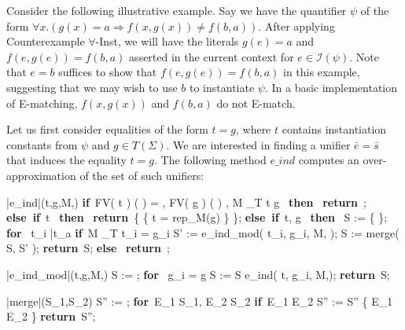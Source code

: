 \documentclass{llncs}
\def\IF{\qtab\keyword{if}\ }
\def\THEN{\ \keyword{then}\ }
\def\ELSE{\untab\qtab\keyword{else}\ }
\def\ELSEIF{\untab\qtab\keyword{else if}\ }
\def\FI{\untab}
\def\RETURN{\keyword{return}\ }
\def\ENDPROC{\untab}
\def\DOFOR{\qtab\keyword{for}\ }
\def\ENDFOR{\untab}
\def\keyword#1{\mbox{\normalshape\bf #1}}
\begin{document}
Consider the following illustrative example.
Say we have the quantifier $\psi$ of the form $\forall x. (g(x) = a \Rightarrow f( x, g( x ) ) \neq f( b, a ))$.
After applying Counterexample $\forall$-Inst, we will have the literals $g(e) = a$ and $f( e, g( e ) ) = f( b, a )$ asserted in the current context for $e \in \mathcal{I}( \psi )$.
Note that $e = b$ suffices to show that $f( e, g( e ) ) = f( b, a )$ in this example, suggesting that we may wish to use $b$ to instantiate $\psi$.
In a basic implementation of E-matching, $f( x, g( x ) )$ and $f( b, a )$ do not E-match.

Let us first consider equalities of the form $t = g$, where $t$ contains instantiation constants from $\psi$ and $g \in T( \Sigma )$.
We are interested in finding a unifier $\bar{e} = \bar{s}$ that induces the equality $t = g$.
The following method $e\_ind$ computes an over-approximation of the set of such unifiers:

\begin{minipage}[t]{.4\linewidth}
\begin{program}
\PROC |e\_ind|(t,g,M,\psi) \BODY
  \IF FV( t ) \cap {}( \psi ) = \emptyset, FV( g ) \cap {}( \psi ) \neq \emptyset,
       M \models_T t \neq g \THEN
    \RETURN \emptyset;
  \ELSEIF t  \THEN
    \RETURN \{ \{ t = rep_M(g) \} \};
  \ELSEIF t, g  \THEN
    S := \{ \emptyset \};
    \DOFOR {} t_i  \bar{t_a} 
      \IF M \not\models_T t_i = g_i
        S' := e\_ind\_mod( t_i, g_i, M, \psi );
        S := merge( S, S' );
      \FI
    \ENDFOR
    \RETURN S;
  \ELSE
    \RETURN \emptyset;
  \FI
\ENDPROC
\end{program}
\end{minipage}
\begin{minipage}[t]{.4\linewidth}
\begin{program}
\PROC |e\_ind\_mod|(t,g,M,\psi) \BODY
  S := \emptyset;
  \DOFOR {} g_i = g
    S := S \cup e\_ind( t, g_i, M,\psi );
  \ENDFOR
  \RETURN S;
\ENDPROC
\end{program}
\begin{program}
\PROC |merge|(S_1,S_2) \BODY
  S'' := \emptyset;
  \DOFOR E_1 \in S_1, E_2 \in S_2
    \IF E_1  E_2 
      S'' := S'' \cup \{ E_1 \cup E_2 \}
    \FI
  \ENDFOR
  \RETURN S'';
\ENDPROC
\end{program}
\end{minipage}
\end{document}
